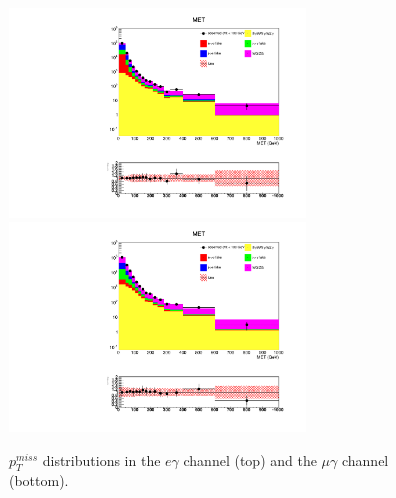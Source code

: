 \documentclass[thesis.tex]{subfiles}
\renewcommand\_{\textunderscore\allowbreak}
\begin{document}
\begin{figure}[hbtp]
  \centering
    \includegraphics[width=0.7\textwidth]{Figures/VALID_egamma_2016ReMiniAOD_met.pdf} \\
    \includegraphics[width=0.7\textwidth]{Figures/VALID_mg_2016ReMiniAOD_met.pdf} 
  \caption{$p_T^{miss}$ distributions in the $e\gamma$ channel (top) and the $\mu\gamma$ channel (bottom).}
    \label{fig:metvalidation}
\end{figure}
\end{document}

